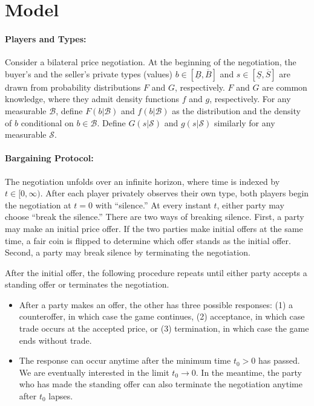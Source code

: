 \section{Model}
\label{sec:model}

\paragraph{Players and Types:} Consider a bilateral price negotiation. At the beginning of the negotiation, the buyer's and the seller's private types (values) $b\in[\underline B,\overline B]$ and $s\in[\underline S,\overline S]$ are drawn from probability distributions $F$ and $G$, respectively.
$F$ and $G$ are common knowledge, where they admit density functions $f$ and $g$, respectively. For any measurable $\mathcal{B}$, define $F(b|\mathcal{B})$ and $f(b|\mathcal{B})$ as the distribution and the density of $b$ conditional on $b\in\mathcal{B}$. Define $G(s|\mathcal{S})$ and $g(s|\mathcal{S})$ similarly for any measurable $\mathcal{S}$.


\paragraph{Bargaining Protocol:} The negotiation unfolds over an infinite horizon, where time is indexed by $t\in[0,\infty)$. After each player privately observes their own type, both players begin the negotiation at $t=0$ with ``silence.'' At every instant $t$, either party may choose ``break the silence.'' There are two ways of breaking silence. First, a party may make an initial price offer. If the two parties make initial offers at the same time, a fair coin is flipped to determine which offer stands as the initial offer. Second, a party may  break silence by terminating the negotiation.


After the initial offer, the following procedure repeats until either party accepts a standing offer or terminates the negotiation. 
    \begin{itemize}
    \item After a party makes an offer, the other has three possible responses: (1) a counteroffer, in which case the game continues, (2) acceptance, in which case trade occurs at the accepted price, or (3) termination, in which case the game ends without trade. 

    \item The response can occur anytime after the minimum time $t_0>0$ has passed. We are eventually interested in the limit $t_0\to 0$. 
    In the meantime, the party who has made the standing offer can also terminate the negotiation anytime after $t_0$ lapses. 
    \end{itemize}

